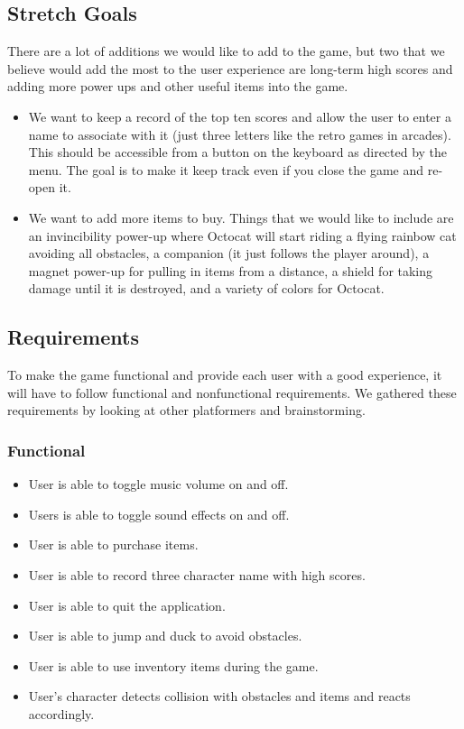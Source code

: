 \documentclass[10pt,conference,onecolumn,compsoc]{IEEEtran}
\begin{document}
\subsection{Stretch Goals}
There are a lot of additions we would like to add to the game, but two that we believe would add the most to the user experience are long-term high scores and adding more power ups and other useful items into the game.

\begin{itemize}

\item We want to keep a record of the top ten scores and allow the user to enter a name to associate with it (just three letters like the retro games in arcades). This should be accessible from a button on the keyboard as directed by the menu. The goal is to make it keep track even if you close the game and re-open it.

\item We want to add more items to buy. Things that we would like to include are an invincibility power-up where Octocat will start riding a flying rainbow cat avoiding all obstacles, a companion (it just follows the player around), a magnet power-up for pulling in items from a distance, a shield for taking damage until it is destroyed, and a variety of colors for Octocat.

\end{itemize}

\subsection{Requirements}
To make the game functional and provide each user with a good experience, it will have to follow functional and nonfunctional requirements. We gathered these requirements by looking at other platformers and brainstorming.

\subsubsection{Functional}
\begin{itemize}
\item User is able to toggle music volume on and off.
\item Users is able to toggle sound effects on and off.
\item User is able to purchase items.
\item User is able to record three character name with high scores.
\item User is able to quit the application.
\item User is able to jump and duck to avoid obstacles.
\item User is able to use inventory items during the game.
\item User's character detects collision with obstacles and items and reacts accordingly.
\end{itemize}
\end{document}
